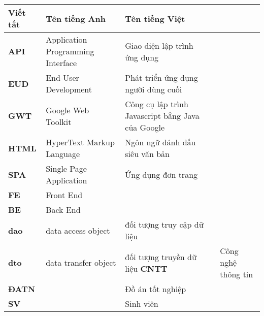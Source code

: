 \documentclass[../DoAn.tex]{subfiles}
\begin{document}
\begin{longtable}{l p{6cm} p{7cm}}
	\hline
   \textbf{Viết tắt}  & \textbf{Tên tiếng Anh}	& \textbf{Tên tiếng Việt} \\ \hline 
	\textbf{API} & Application Programming Interface & Giao diện lập trình ứng dụng\\
	\textbf{EUD} & End-User Development & Phát triển ứng dụng người dùng cuối\\
	\textbf{GWT} & Google Web Toolkit & Công cụ lập trình Javascript bằng Java của Google\\
	\textbf{HTML} & HyperText Markup Language & Ngôn ngữ đánh dấu siêu văn bản\\
        \textbf{SPA} & Single Page Application & Ứng dụng đơn trang\\
        \textbf{FE}   & Front End & \\
        \textbf{BE} & Back End & \\
        \textbf{dao} & data access object &  đối tượng truy cập dữ liệu \\
        \textbf{dto} & data transfer object & đối tượng truyền dữ liệu
	\textbf{CNTT }  &   & Công nghệ thông tin\\
	\textbf{ĐATN} &  & Đồ án tốt nghiệp \\
	\textbf{SV} &  & Sinh viên \\

    \hline
\end{longtable}
\end{document}
